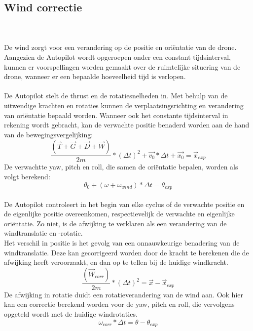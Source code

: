 \subsection{Wind correctie}
\\
\\
De wind zorgt voor een verandering op de positie en ori\"entatie van de drone. Aangezien de Autopilot wordt opgeroepen onder een constant tijdsinterval, kunnen er voorspellingen worden gemaakt over de ruimtelijke situering van de drone, wanneer er een bepaalde hoeveelheid tijd is verlopen.
\\
\\
De Autopilot stelt de thrust en de rotatiesnelheden in. Met behulp van de uitwendige krachten en rotaties kunnen de verplaatsingsrichting en verandering van ori\"entatie bepaald worden. Wanneer ook het constante tijdsinterval in rekening wordt gebracht, kan de verwachte positie benaderd worden aan de hand van de bewegingsvergelijking:
\begin{equation}
	 \frac{(\vec{T} + \vec{G} + \vec{D} + \vec{W}) }{2m} * (\Delta t)^2 + \vec{v_0} * \Delta t + \vec{x_0} = \vec{x}_{exp}
\end{equation}
De verwachtte yaw, pitch en roll, die samen de ori\"entatie bepalen, worden als volgt berekend:
\begin{equation}
	\theta_0 + (\omega + \omega_{wind})*\Delta t = \theta_{exp}
\end{equation}
\\
De Autopilot controleert in het begin van elke cyclus of de verwachte positie en de eigenlijke positie overeenkomen, respectievelijk de verwachte en eigenlijke ori\"entatie. Zo niet, is de afwijking te verklaren als een verandering van de windtranslatie en -rotatie. 
\\
Het verschil in positie is het gevolg van een onnauwkeurige benadering van de windtranslatie. Deze kan gecorrigeerd worden door de kracht te berekenen die de afwijking heeft veroorzaakt, en dan op te tellen bij de huidige windkracht.
\begin{equation}
	\frac{(\vec{W}_{corr}) }{2m} * (\Delta t)^2 = \vec{x}-\vec{x}_{exp}
\end{equation}
De afwijking in rotatie duidt een rotatieverandering van de wind aan. Ook hier kan een correctie berekend worden voor de yaw, pitch en roll, die vervolgens opgeteld wordt met de huidige windrotaties.
\begin{equation}
	\omega_{corr}*\Delta t = \theta-\theta_{exp}
\end{equation}